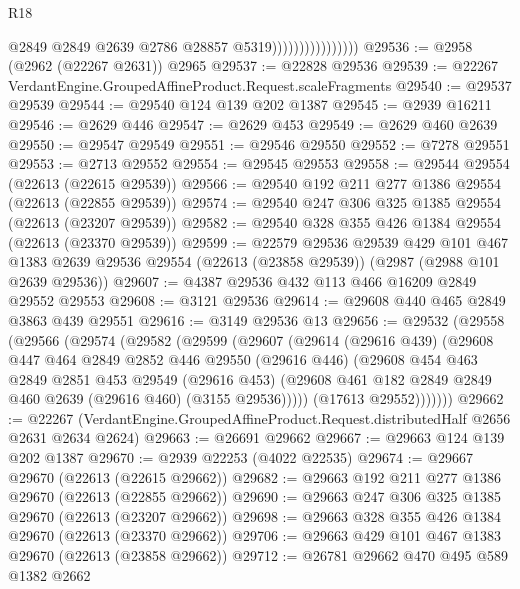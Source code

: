 \begin{lexlean}{R18}
\begin{coremodule}
                                    @2849
                                    @2849
                                    @2639
                                    @2786
                                    @28857
                                    @5319))))))))))))))))
@29536 := @2958 (@2962 (@22267 @2631)) @2965
@29537 := @22828 @29536
@29539 := @22267 VerdantEngine.GroupedAffineProduct.Request.scaleFragments
@29540 := @29537 @29539
@29544 := @29540 @124 @139 @202 @1387
@29545 := @2939 @16211
@29546 := @2629 @446
@29547 := @2629 @453
@29549 := @2629 @460 @2639
@29550 := @29547 @29549
@29551 := @29546 @29550
@29552 := @7278 @29551
@29553 := @2713 @29552
@29554 := @29545 @29553
@29558 := @29544 @29554 (@22613 (@22615 @29539))
@29566 := @29540 @192 @211 @277 @1386 @29554 (@22613 (@22855 @29539))
@29574 := @29540 @247 @306 @325 @1385 @29554 (@22613 (@23207 @29539))
@29582 := @29540 @328 @355 @426 @1384 @29554 (@22613 (@23370 @29539))
@29599 := @22579
    @29536
    @29539
    @429
    @101
    @467
    @1383
    @2639
    @29536
    @29554
    (@22613 (@23858 @29539))
    (@2987 (@2988 @101 @2639 @29536))
@29607 := @4387 @29536 @432 @113 @466 @16209 @2849 @29552 @29553
@29608 := @3121 @29536
@29614 := @29608 @440 @465 @2849 @3863 @439 @29551
@29616 := @3149 @29536 @13
@29656 := @29532
    (@29558
      (@29566
        (@29574
          (@29582
            (@29599
              (@29607
                (@29614
                  (@29616 @439)
                  (@29608
                    @447
                    @464
                    @2849
                    @2852
                    @446
                    @29550
                    (@29616 @446)
                    (@29608
                      @454
                      @463
                      @2849
                      @2851
                      @453
                      @29549
                      (@29616 @453)
                      (@29608 @461 @182 @2849 @2849 @460 @2639 (@29616 @460) (@3155 @29536)))))
                (@17613 @29552)))))))
@29662 := @22267
    (VerdantEngine.GroupedAffineProduct.Request.distributedHalf @2656 @2631 @2634 @2624)
@29663 := @26691 @29662
@29667 := @29663 @124 @139 @202 @1387
@29670 := @2939 @22253 (@4022 @22535)
@29674 := @29667 @29670 (@22613 (@22615 @29662))
@29682 := @29663 @192 @211 @277 @1386 @29670 (@22613 (@22855 @29662))
@29690 := @29663 @247 @306 @325 @1385 @29670 (@22613 (@23207 @29662))
@29698 := @29663 @328 @355 @426 @1384 @29670 (@22613 (@23370 @29662))
@29706 := @29663 @429 @101 @467 @1383 @29670 (@22613 (@23858 @29662))
@29712 := @26781 @29662 @470 @495 @589 @1382 @2662

\end{coremodule}
\end{lexlean}
